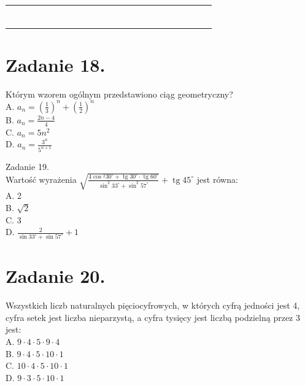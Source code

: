 \documentclass[10pt]{article}
\begin{document}
\begin{center}
\begin{tabular}{|c|c|c|c|c|c|c|c|c|c|c|c|c|c|c|c|c|c|c|c|c|c|c|c|}
\hline
 &  &  &  &  &  &  &  &  &  &  &  &  &  &  &  &  &  &  &  &  &  &  &  \\
\hline
 &  &  &  &  &  &  &  &  &  &  &  &  &  &  &  &  &  &  &  &  &  &  &  \\
\hline
 &  &  &  &  &  &  &  &  &  &  &  &  &  &  &  &  &  &  &  &  &  &  &  \\
\hline
 &  &  &  &  &  &  &  &  &  &  &  &  &  &  &  &  &  &  &  &  &  &  &  \\
\hline
 &  &  &  &  &  &  &  &  &  &  &  &  &  &  &  &  &  &  &  &  &  &  &  \\
\hline
 &  &  &  &  &  &  &  &  &  &  &  &  &  &  &  &  &  &  &  &  &  &  &  \\
\hline
 &  &  &  &  &  &  &  &  &  &  &  &  &  &  &  &  &  &  &  &  &  &  &  \\
\hline
 &  &  &  &  &  &  &  &  &  &  &  &  &  &  &  &  &  &  &  &  &  &  &  \\
\hline
\end{tabular}
\end{center}

\section*{Zadanie 18.}
Którym wzorem ogólnym przedstawiono ciąg geometryczny?\\
A. \(a_{n}=\left(\frac{1}{3}\right)^{n}+\left(\frac{1}{2}\right)^{n}\)\\
B. \(a_{n}=\frac{2 n-4}{4}\)\\
C. \(a_{n}=5 n^{2}\)\\
D. \(a_{n}=\frac{3^{n}}{5^{n+1}}\)

Zadanie 19.\\
Wartość wyrażenia \(\sqrt{\frac{4 \cos { }^{2} 30^{\circ}+\operatorname{tg} 30^{\circ} \cdot \operatorname{tg} 60^{\circ}}{\sin ^{2} 33^{\circ}+\sin ^{2} 57^{\circ}}}+\operatorname{tg} 45^{\circ}\) jest równa:\\
A. 2\\
B. \(\sqrt{2}\)\\
C. 3\\
D. \(\frac{2}{\sin 33^{\circ}+\sin 57^{\circ}}+1\)

\section*{Zadanie 20.}
Wszystkich liczb naturalnych pięciocyfrowych, w których cyfrą jedności jest 4, cyfra setek jest liczba nieparzystą, a cyfra tysięcy jest liczbą podzielną przez 3 jest:\\
A. \(9 \cdot 4 \cdot 5 \cdot 9 \cdot 4\)\\
B. \(9 \cdot 4 \cdot 5 \cdot 10 \cdot 1\)\\
C. \(10 \cdot 4 \cdot 5 \cdot 10 \cdot 1\)\\
D. \(9 \cdot 3 \cdot 5 \cdot 10 \cdot 1\)
\end{document}
